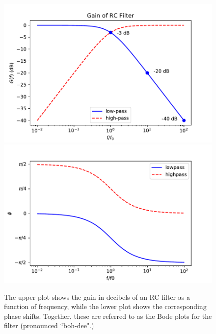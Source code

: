 \documentclass[12pt,oneside]{book}
\begin{document}
\begin{figure}[htbp]
\begin{center}
\includegraphics[height=0.3\textheight]{figs/rcgaindb.pdf} \\
\includegraphics[height=0.3\textheight]{figs/rcphase.pdf} \\
\caption{ The upper plot shows the gain in decibels of an RC filter as a function of frequency, while the lower plot shows the corresponding phase shifts.  Together, these are referred to as the Bode plots for the filter (pronounced ``boh-dee".)}
\label{fig:rcbode}
\end{center}
\end{figure}
\end{document}
